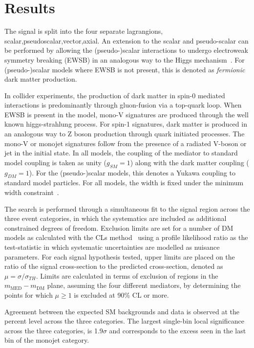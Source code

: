 \section{Results}
The signal is split into the four separate lagrangions, scalar,pseudoscalar,vector,axial. An extension to the scalar and pseudo-scalar can be performed by allowing the (pseudo-)scalar interactions to undergo electroweak symmetry breaking (EWSB) in an analogous way to 
the Higgs mechanism~\cite{somepapers}. For (pseudo-)scalar models where EWSB is not present, this is denoted as \emph{fermionic} dark matter production.

In collider experiments, the production of dark matter in spin-0 mediated interactions is predominantly through gluon-fusion via a top-quark loop. 
When EWSB is present in the model, mono-V signatures are produced through the well known higgs-strahlung%
process. For spin-1 signatures, dark matter is produced in an analogous way to Z boson production through quark initiated processes. The mono-V or monojet signatures follow 
from the presence of a radiated V-boson or jet in the initial state. In all models, the coupling of the mediator to standard model coupling is taken as unity ($g_{SM}=1$) along with 
the dark matter coupling ($g_{DM}=1$). For the (pseudo-)scalar models, this denotes a Yukawa coupling to standard model particles. 
For all models, the width is fixed under the minimum width constraint~\cite{philnote}.

The search is performed through  a simultaneous fit to the signal region across the three event categories, in which the systematics are included as additional constrained degrees
of freedom. Exclusion limits are set for a number of DM models as calculated with  the CLs method~\cite{cls} using a profile likelihood ratio as the test-statistic in which systematic uncertainties are modelled as nuisance parameters. For each signal hypothesis tested, upper limits are placed on the ratio of the signal cross-section to the predicted cross-section, denoted as $\mu=\sigma/\sigma_{TH}$. Limits are calculated in terms of exclusion of regions in the $m_{\mathrm{MED}}-m_{\textrm{DM}}$ plane, assuming the four different mediators, 
by determining the points for which $\mu\ge1$ is excluded at 90\% CL or more.

Agreement between the expected SM backgrounds and data is observed at the percent level across the three categories. The largest single-bin local significance across the three categories, is 1.9$\sigma$ and corresponds to the excess seen in the last \ETm bin of the monojet category.

